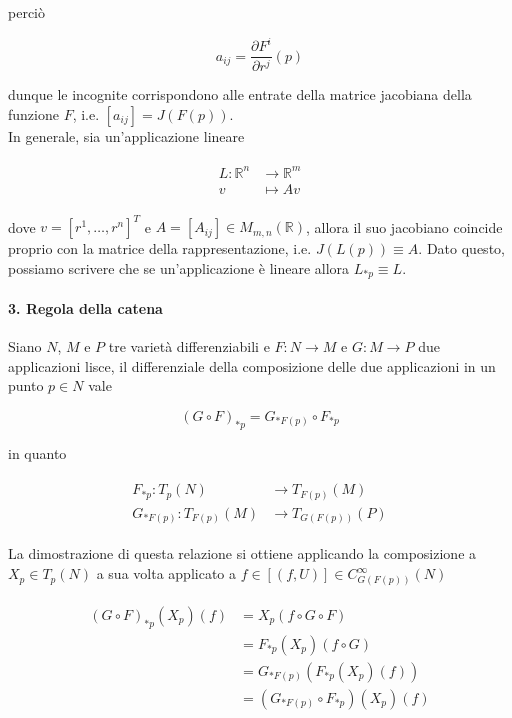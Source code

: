 perciò

\begin{equation}
	a_{ij} = \dfrac{\partial F^{i}}{\partial r^{j}} (p)
\end{equation}

dunque le incognite corrispondono alle entrate della matrice jacobiana della funzione $ F $, i.e. $ [a_{ij}] = J(F(p)) $.\\
In generale, sia un'applicazione lineare

\begin{align}
	\begin{split}
		L : \mathbb{R}^{n} &\to \mathbb{R}^{m}\\
		v &\mapsto A v
	\end{split}
\end{align}

dove $ v = [r^{1},\dots,r^{n}]^{T} $ e $ A = [A_{ij}] \in M_{m,n}(\mathbb{R}) $, allora il suo jacobiano coincide proprio con la matrice della rappresentazione, i.e. $ J(L(p)) \equiv A $. Dato questo, possiamo scrivere che se un'applicazione è lineare allora $ L_{*p} \equiv L $.

\paragraph{3. Regola della catena}

Siano $ N $, $ M $ e $ P $ tre varietà differenziabili e $ F : N \to M $ e $ G : M \to P $ due applicazioni lisce, il differenziale della composizione delle due applicazioni in un punto $ p \in N $ vale

\begin{equation}
	(G \circ F)_{*p} = G_{*F(p)} \circ F_{*p}
\end{equation}

in quanto

\begin{align}
	\begin{split}
		F_{*p} : T_{p}(N) &\to T_{F(p)}(M)\\
		G_{*F(p)} : T_{F(p)}(M) &\to T_{G(F(p))}(P)
	\end{split}
\end{align}

La dimostrazione di questa relazione si ottiene applicando la composizione a $ X_{p} \in T_{p}(N) $ a sua volta applicato a $ f \in [(f,U)] \in C_{G(F(p))}^{\infty}(N) $

\begin{align}
	\begin{split}
		(G \circ F)_{*p} (X_{p})(f) &= X_{p} (f \circ G \circ F)\\
		&= F_{*p} (X_{p}) (f \circ G)\\
		&= G_{*F(p)} (F_{*p} (X_{p})(f))\\
		&= (G_{*F(p)} \circ F_{*p})(X_{p})(f)
	\end{split}
\end{align}

